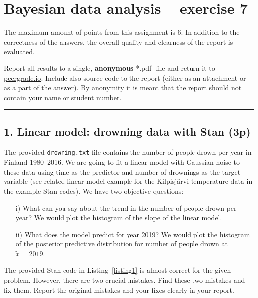 \documentclass[a4paper,11pt]{article}
\newcommand{\HRule}{\rule{\linewidth}{0.5mm}}
\begin{document}

\section*{Bayesian data analysis -- exercise 7}

The maximum amount of points from this assignment is 6. In addition to the correctness of the answers, the overall quality and clearness of the report is evaluated.

Report all results to a single, {\bf anonymous} *.pdf -file and return it to \href{peergrade.io}{peergrade.io}. Include also source code to the report (either as an attachment or as a part of the answer). By anonymity it is meant that the report should not contain your name or student number.

\HRule

\vspace{1cm}


\subsection*{1. Linear model: drowning data with Stan (3p)}

The provided {\tt drowning.txt} file contains the number of people drown per year in Finland 1980--2016.
%
We are going to fit a linear model with Gaussian noise to these data using time as the predictor and number of drownings as the target variable (see related linear model example for the Kilpisjärvi-temperature data in the example Stan codes).
We have two objective questions:
\begin{itemize}
	\item [i)] What can you say about the trend in the number of people drown per year? We would plot the histogram of the slope of the linear model.
	\item [ii)] What does the model predict for year 2019? We would plot the histogram of the posterior predictive distribution for number of people drown at $\tilde x=2019$.
\end{itemize}

The provided Stan code in Listing~\ref{listing1} is almost correct for the given problem. However, there are two crucial mistakes. Find these two mistakes and fix them. Report the original mistakes and your fixes clearly in your report.
\end{document}

